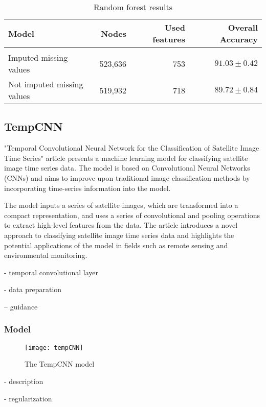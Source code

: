 \begin{table}[!htbp]
  \centering
    \begin{tabular}{lrrr}
    Model                       & Nodes   & Used features & Overall Accuracy             \\[0.2cm] 
    \hline \\[-0.2cm]
    Imputed missing values      & 523,636  & 753          & $91.03 \pm 0.42$\\
    Not imputed missing values  & 519,932  & 718          & $89.72 \pm 0.84$
    \end{tabular}
  \caption{Random forest results}
  \label{tab:rfresults}
\end{table}


\subsection{TempCNN}
"Temporal Convolutional Neural Network for the Classification of Satellite Image Time Series" article \cite{tempCNN} presents a machine learning model for classifying satellite image time series data.
The model is based on Convolutional Neural Networks (CNNs) and aims to improve upon traditional image classification methods by incorporating time-series information into the model.

The model inputs a series of satellite images, which are transformed into a compact representation, and uses a series of convolutional and pooling operations to extract high-level features from the data.
The article introduces a novel approach to classifying satellite image time series data and highlights the potential applications of the model in fields such as remote sensing and environmental monitoring.

- temporal convolutional layer

- data preparation

-- guidance


\subsubsection{Model}

\begin{figure}[!htbp]
  \centering
  \texttt{[image: tempCNN]}
  \caption{The TempCNN model \cite{tempCNN}}
\end{figure}

- description

- regularization

